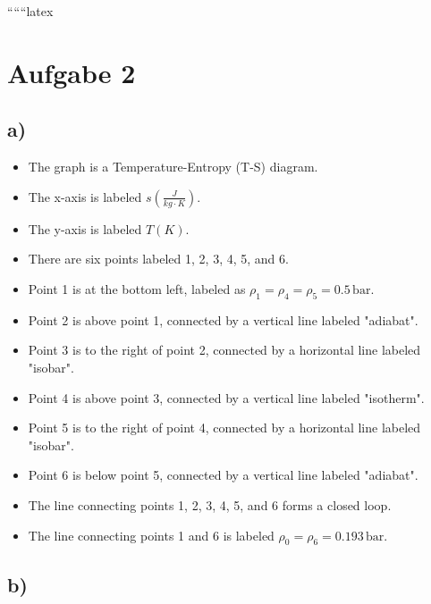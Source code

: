 
``````latex


\section*{Aufgabe 2}

\subsection*{a)}

\begin{itemize}
    \item The graph is a Temperature-Entropy (T-S) diagram.
    \item The x-axis is labeled \( s \left( \frac{J}{kg \cdot K} \right) \).
    \item The y-axis is labeled \( T(K) \).
    \item There are six points labeled 1, 2, 3, 4, 5, and 6.
    \item Point 1 is at the bottom left, labeled as \( \rho_1 = \rho_4 = \rho_5 = 0.5 \, \text{bar} \).
    \item Point 2 is above point 1, connected by a vertical line labeled "adiabat".
    \item Point 3 is to the right of point 2, connected by a horizontal line labeled "isobar".
    \item Point 4 is above point 3, connected by a vertical line labeled "isotherm".
    \item Point 5 is to the right of point 4, connected by a horizontal line labeled "isobar".
    \item Point 6 is below point 5, connected by a vertical line labeled "adiabat".
    \item The line connecting points 1, 2, 3, 4, 5, and 6 forms a closed loop.
    \item The line connecting points 1 and 6 is labeled \( \rho_0 = \rho_6 = 0.193 \, \text{bar} \).
\end{itemize}

\subsection*{b)}

